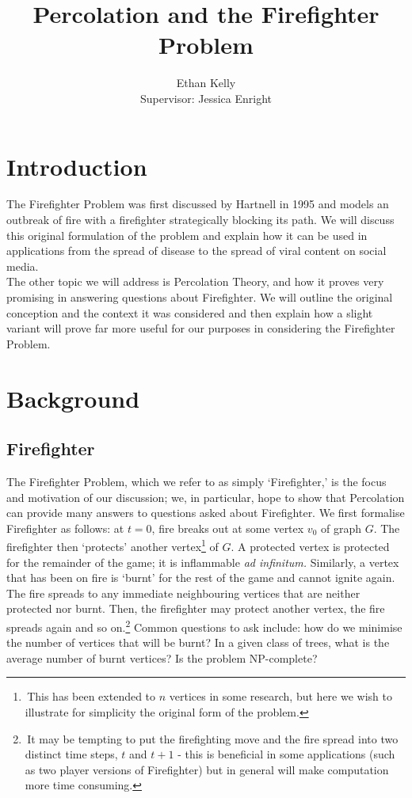 \documentclass[11pt]{amsart}
\title{Percolation and the Firefighter Problem}
\author{Ethan Kelly\\{Supervisor: Jessica Enright}}
\begin{document}
\maketitle

\section{Introduction}
\label{sec:intro}

The Firefighter Problem was first discussed by Hartnell in 1995 \cite{hartnell95} and models an outbreak of fire with a firefighter strategically blocking its path. We will discuss this original formulation of the problem and explain how it can be used in applications from the spread of disease to the spread of viral content on social media.\\

The other topic we will address is Percolation Theory, and how it proves very promising in answering questions about Firefighter. We will outline the original conception and the context it was considered and then explain how a slight variant will prove far more useful for our purposes in considering the Firefighter Problem.


\section{Background}

\subsection{Firefighter}
\label{sec:fire}

The Firefighter Problem, which we refer to as simply `Firefighter,' is the focus and motivation of our discussion; we, in particular, hope to show that Percolation can provide many answers to questions asked about Firefighter. We first formalise Firefighter as follows: at $t=0$, fire breaks out at some vertex $v_0$ of graph $G$. The firefighter then `protects' another vertex\footnote{\,This has been extended to $n$ vertices in some research, but here we wish to illustrate for simplicity the original form of the problem.} of $G$. A protected vertex is protected for the remainder of the game; it is inflammable \textit{ad infinitum.} Similarly, a vertex that has been on fire is `burnt' for the rest of the game and cannot ignite again. The fire spreads to any immediate neighbouring vertices that are neither protected nor burnt. Then, the firefighter may protect another vertex, the fire spreads again and so on.\footnote{\,It may be tempting to put the firefighting move and the fire spread into two distinct time steps, $t$ and $t+1$ - this is beneficial in some applications (such as two player versions of Firefighter) but in general will make computation more time consuming.} Common questions to ask include: how do we minimise the number of vertices that will be burnt? In a given class of trees, what is the average number of burnt vertices? Is the problem NP-complete?\\
\end{document}
